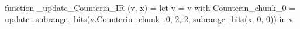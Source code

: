 function _update_Counterin_IR (v, x) = let v = { v with Counterin_chunk_0 = update_subrange_bits(v.Counterin_chunk_0, 2, 2, subrange_bits(x, 0, 0)) } in
  v
